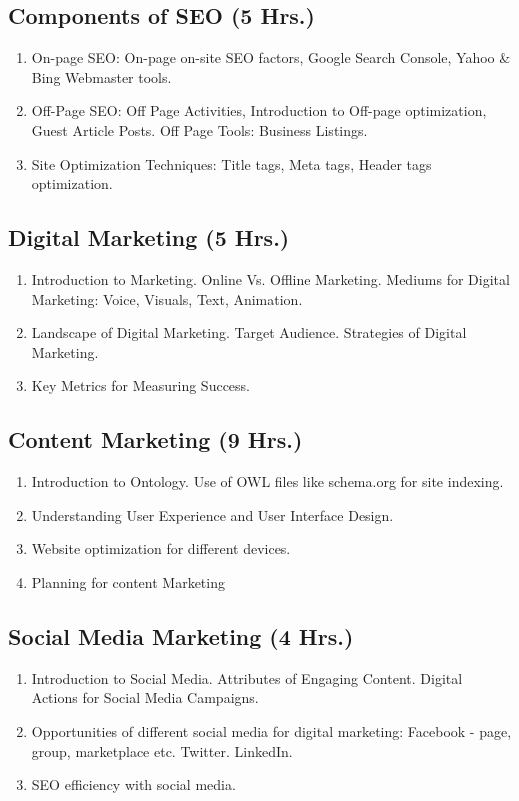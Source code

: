 \subsection{Components of SEO \hfill (5 Hrs.)} 
\begin{enumerate}
    \item On-page SEO: On-page on-site SEO factors, Google Search Console, Yahoo \& Bing Webmaster tools. 
    \item Off-Page SEO: Off Page Activities, Introduction to Off-page optimization, Guest Article Posts. Off Page Tools: Business Listings.
    \item Site Optimization Techniques: Title tags, Meta tags, Header tags optimization.
    
\end{enumerate}


\subsection{Digital Marketing \hfill (5 Hrs.)}
\begin{enumerate}
    \item Introduction to Marketing. Online Vs. Offline Marketing. Mediums for Digital Marketing: Voice, Visuals, Text, Animation.
    \item Landscape of Digital Marketing. Target Audience. Strategies of Digital Marketing.
    \item Key Metrics for Measuring Success.
\end{enumerate}

\subsection{Content Marketing \hfill (9 Hrs.)}

\begin{enumerate}
    \item Introduction to Ontology. Use of OWL files like schema.org for site indexing.
    \item Understanding User Experience and User Interface Design.
    \item Website optimization for different devices.
    \item Planning for content Marketing
\end{enumerate}

\subsection{Social Media Marketing \hfill (4 Hrs.)} 
\begin{enumerate}
    \item Introduction to Social Media. Attributes of Engaging Content. Digital Actions for Social Media Campaigns.
    \item Opportunities of different social media for digital marketing: Facebook - page, group, marketplace etc. Twitter. LinkedIn.
    \item SEO efficiency with social media.
\end{enumerate}

